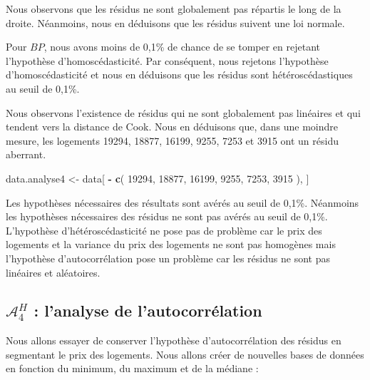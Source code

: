 \documentclass[
  11pt,
  french,
]{article}
\newenvironment{Shaded}{\begin{snugshade}}{\end{snugshade}}
\newcommand{\DecValTok}[1]{\textcolor[rgb]{0.00,0.00,0.81}{#1}}
\newcommand{\KeywordTok}[1]{\textcolor[rgb]{0.13,0.29,0.53}{\textbf{#1}}}
\newcommand{\NormalTok}[1]{#1}
\newcommand{\OperatorTok}[1]{\textcolor[rgb]{0.81,0.36,0.00}{\textbf{#1}}}
\newcommand{\StringTok}[1]{\textcolor[rgb]{0.31,0.60,0.02}{#1}}
\begin{document}
Nous observons que les résidus ne sont globalement pas répartis le long
de la droite. Néanmoins, nous en déduisons que les résidus suivent une
loi normale.

Pour \(BP\), nous avons moins de 0,1\% de chance de se tomper en
rejetant l'hypothèse d'homoscédasticité. Par conséquent, nous rejetons
l'hypothèse d'homoscédasticité et nous en déduisons que les résidus sont
hétéroscédastiques au seuil de 0,1\%.

Nous observons l'existence de résidus qui ne sont globalement pas
linéaires et qui tendent vers la distance de Cook. Nous en déduisons
que, dans une moindre mesure, les logements 19294, 18877, 16199, 9255,
7253 et 3915 ont un résidu aberrant.

\begin{Shaded}
\begin{Highlighting}[]
\NormalTok{data.analyse4 <-}\StringTok{ }\NormalTok{data[ }\OperatorTok{-}\StringTok{ }\KeywordTok{c}\NormalTok{( }\DecValTok{19294}\NormalTok{,}
                            \DecValTok{18877}\NormalTok{,}
                            \DecValTok{16199}\NormalTok{,}
                            \DecValTok{9255}\NormalTok{,}
                            \DecValTok{7253}\NormalTok{,}
                            \DecValTok{3915}\NormalTok{ ), ]}
\end{Highlighting}
\end{Shaded}

Les hypothèses nécessaires des résultats sont avérés au seuil de 0,1\%.
Néanmoins les hypothèses nécessaires des résidus ne sont pas avérés au
seuil de 0,1\%. L'hypothèse d'hétéroscédasticité ne pose pas de problème
car le prix des logements et la variance du prix des logements ne sont
pas homogènes mais l'hypothèse d'autocorrélation pose un problème car
les résidus ne sont pas linéaires et aléatoires.

\newpage

\hypertarget{mathcala_4h-lanalyse-de-lautocorruxe9lation}{%
\subsection{\texorpdfstring{\(\mathcal{A}_{4}^{H}\) : l'analyse de
l'autocorrélation}{\textbackslash mathcal\{A\}\_\{4\}\^{}\{H\} : l'analyse de l'autocorrélation}}\label{mathcala_4h-lanalyse-de-lautocorruxe9lation}}

Nous allons essayer de conserver l'hypothèse d'autocorrélation des
résidus en segmentant le prix des logements. Nous allons créer de
nouvelles bases de données en fonction du minimum, du maximum et de la
médiane :
\end{document}
